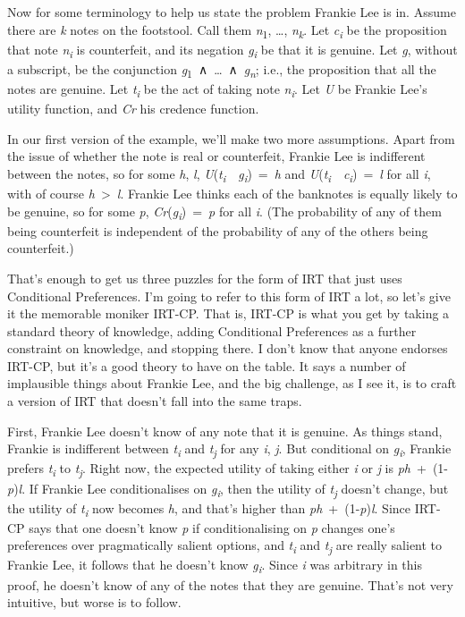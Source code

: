 \documentclass[
  10pt,
  letterpaper,
  twoside]{scrbook}
\begin{document}
Now for some terminology to help us state the problem Frankie Lee is in.
Assume there are \emph{k} notes on the footstool. Call them
\emph{n}\textsubscript{1}, \ldots, \emph{n\textsubscript{k}}. Let
\emph{c\textsubscript{i}} be the proposition that note
\emph{n\textsubscript{i}} is counterfeit, and its negation
\emph{g\textsubscript{i}} be that it is genuine. Let \emph{g}, without a
subscript, be the conjunction
\emph{g}\textsubscript{1}~∧~\ldots~∧~\emph{g\textsubscript{n}}; i.e.,
the proposition that all the notes are genuine. Let
\emph{t\textsubscript{i}} be the act of taking note
\emph{n\textsubscript{i}}. Let \emph{U} be Frankie Lee's utility
function, and \emph{Cr} his credence function.

In our first version of the example, we'll make two more assumptions.
Apart from the issue of whether the note is real or counterfeit, Frankie
Lee is indifferent between the notes, so for some \emph{h}, \emph{l},
\emph{U}(\emph{t\textsubscript{i}}~\textbar~\emph{g\textsubscript{i}})~=~\emph{h}
and
\emph{U}(\emph{t\textsubscript{i}}~\textbar~\emph{c\textsubscript{i}})~=~\emph{l}
for all \emph{i}, with of course \emph{h}~\textgreater~\emph{l}. Frankie
Lee thinks each of the banknotes is equally likely to be genuine, so for
some \emph{p}, \emph{Cr}(\emph{g\textsubscript{i}})~=~\emph{p} for all
\emph{i}. (The probability of any of them being counterfeit is
independent of the probability of any of the others being counterfeit.)

That's enough to get us three puzzles for the form of IRT that just uses
Conditional Preferences. I'm going to refer to this form of IRT a lot,
so let's give it the memorable moniker IRT-CP. That is, IRT-CP is what
you get by taking a standard theory of knowledge, adding Conditional
Preferences as a further constraint on knowledge, and stopping there. I
don't know that anyone endorses IRT-CP, but it's a good theory to have
on the table. It says a number of implausible things about Frankie Lee,
and the big challenge, as I see it, is to craft a version of IRT that
doesn't fall into the same traps.

First, Frankie Lee doesn't know of any note that it is genuine. As
things stand, Frankie is indifferent between \emph{t\textsubscript{i}}
and \emph{t\textsubscript{j}} for any \emph{i}, \emph{j}. But
conditional on \emph{g\textsubscript{i}}, Frankie prefers
\emph{t\textsubscript{i}} to \emph{t\textsubscript{j}}. Right now, the
expected utility of taking either \emph{i} or \emph{j} is
\emph{ph}~+~(1-\emph{p})\emph{l}. If Frankie Lee conditionalises on
\emph{g\textsubscript{i}}, then the utility of \emph{t\textsubscript{j}}
doesn't change, but the utility of \emph{t\textsubscript{i}} now becomes
\emph{h}, and that's higher than \emph{ph}~+~(1-\emph{p})\emph{l}. Since
IRT-CP says that one doesn't know \emph{p} if conditionalising on
\emph{p} changes one's preferences over pragmatically salient options,
and \emph{t\textsubscript{i}} and \emph{t\textsubscript{j}} are really
salient to Frankie Lee, it follows that he doesn't know
\emph{g\textsubscript{i}}. Since \emph{i} was arbitrary in this proof,
he doesn't know of any of the notes that they are genuine. That's not
very intuitive, but worse is to follow.
\end{document}
